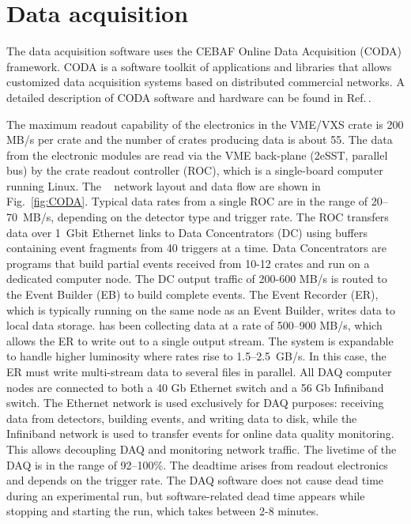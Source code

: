 
\section[Data Acquisition]{Data acquisition \label{sec:daq}}



The \gx{} data acquisition software uses the CEBAF Online Data Acquisition (CODA) framework. CODA is a software toolkit of applications and libraries that allows customized data acquisition systems based on distributed commercial networks. A detailed description of CODA software and hardware can be found in Ref.\,\cite{CLAS12DAQ}. 

The maximum readout capability of the electronics in the VME/VXS crate is 200 MB/s per crate and the number of crates producing data is about 55.
The data from the electronic modules are read via the VME back-plane (2eSST, parallel bus) by the crate readout controller (ROC), which is a single-board computer running Linux.
The \gx~ network layout and data flow are shown in Fig.~\ref{fig:CODA}.
Typical data rates from a single ROC are in the range of 20--70~MB/s, depending on the detector type and trigger rate.
The ROC transfers data over 1~Gbit Ethernet links to Data Concentrators (DC) using buffers containing event fragments from 40 triggers at a time. Data Concentrators are programs that build partial events received from 10-12 crates and run on a dedicated computer node.
The DC output traffic of 200-600 MB/s is routed to the Event Builder (EB) to build complete events.
The Event Recorder (ER), which is typically running on the same node as an Event Builder, writes data to local data storage.
\gx{} has been collecting data at a rate of 500--900 MB/s, which allows the ER to write out to a single output stream. The system is expandable to handle higher luminosity where rates rise to 1.5--2.5~GB/s. In this case, the ER must write multi-stream data to several files in parallel.
All DAQ computer nodes are connected to both a 40 Gb Ethernet switch and a 56 Gb Infiniband switch.
The Ethernet network is used exclusively for DAQ purposes: receiving data from detectors, building events, and writing data to disk, 
while the Infiniband network is used to transfer events for online data quality monitoring. 
This allows decoupling DAQ and monitoring network traffic.
The livetime of the DAQ is in the range of 92--100\%. The deadtime arises from readout electronics and depends on the trigger rate.  
The DAQ software does not cause dead time during an experimental run, but software-related dead time appears while stopping and starting the run, which takes between 2-8 minutes. 

